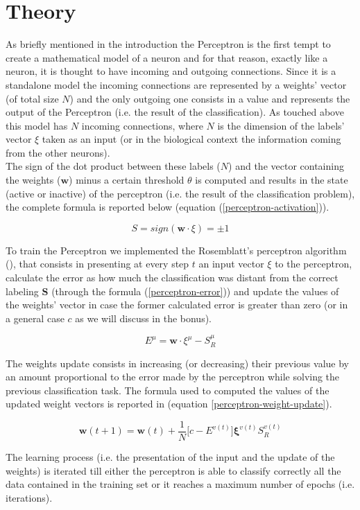 \section{Theory}
\label{sec:fundamentals}
As briefly mentioned in the introduction the Perceptron is the first tempt to create a mathematical model of
a neuron and for that reason, exactly like a neuron, it is thought to have incoming and outgoing connections. Since it is a standalone
model the incoming connections are represented by a weights' vector (of total size $N$) and the only outgoing one consists in a value and represents
the output of the Perceptron (i.e. the result of the classification). As touched above this model has $N$ incoming connections,
where $N$ is the dimension of the labels' vector $\xi$ taken as an input (or in the biological context the information coming from the other neurons).\\
The sign of the dot product between these labels ($N$) and the vector containing the weights ($\mathsf{\bm{w}}$) minus a certain threshold
$\theta$ is computed and results in the state (active or inactive) of the perceptron (i.e. the result of the classification problem),
the complete formula is reported below (equation (\ref{perceptron-activation})).

\begin{equation} \label{perceptron-activation}
    S = sign(\mathsf{\bm{w}} \cdotp \xi) = \pm 1
\end{equation}

To train the Perceptron we implemented the Rosemblatt's perceptron algorithm (\cite{rosenblatt1958perceptron}), that consists in
presenting at every step $t$ an input vector $\xi$ to the perceptron, calculate the error as how much the classification was distant from
the correct labeling $\bm{S}$ (through the formula (\ref{perceptron-error})) and update the values of the weights' vector in case the former
calculated error is greater than zero (or in a general case $c$ as we will discuss in the bonus).

\begin{equation} \label{perceptron-error}
    E^\mu = \mathsf{\bm{w}} \cdotp \xi^\mu - S^\mu_R
\end{equation}

The weights update consists in increasing (or decreasing) their previous value by an amount proportional to the error made
by the perceptron while solving the previous classification task. The formula used to computed the values of the updated weight vectors is reported in (equation
\ref{perceptron-weight-update}).

\begin{equation} \label{perceptron-weight-update}
    \mathsf{\bm{w}}(t+1) = \mathsf{\bm{w}}(t) + \frac{1}{N} \big[c - E^{v(t)}\big] \bm{\xi}^{v(t)} S^{v(t)}_R
\end{equation}

The learning process (i.e. the presentation of the input and the update of the weights) is iterated till either the perceptron is able to classify correctly
all the data contained in the training set or it reaches a maximum number of epochs (i.e. iterations).